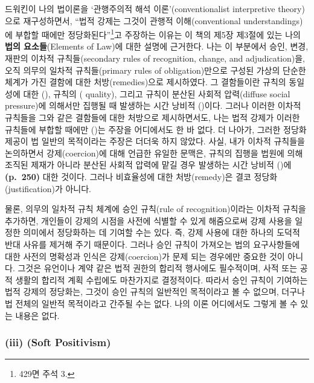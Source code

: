 드워킨이 나의 법이론을 `관행주의적 해석 이론'(conventionalist
interpretive theory)으로 재구성하면서, ``법적 강제는 그것이 관행적
이해(conventional understandings)에 부합할 때에만
정당화된다''\footnote{ 429면 주석 3.}고 주장하는 이유는 이 책의
제5장 제3절에 있는 나의 \textbf{법의 요소들}(Elements of Law)에 대한
설명에 근거한다. 나는 이 부분에서 승인, 변경, 재판의 이차적
규칙들(secondary rules of recognition, change, and adjudication)을, 오직
의무의 일차적 규칙들(primary rules of obligation)만으로 구성된 가상의
단순한 체계가 가진 결함에 대한 처방(remedies)으로 제시하였다. 그
결함들이란 규칙의 동일성에 대한 (),
규칙의 ( quality), 그리고 규칙이 분산된 사회적
압력(diffuse social pressure)에 의해서만 집행될 때 발생하는 시간 낭비적
()이다. 그러나 이러한 이차적 규칙들을
그와 같은 결함들에 대한 처방으로 제시하면서도, 나는 법적 강제가 이러한
규칙들에 부합할 때에만 ()는 주장을
어디에서도 한 바 없다. 더 나아가, 그러한 정당화 제공이 법 일반의
목적이라는 주장은 더더욱 하지 않았다. 사실, 내가 이차적 규칙들을
논의하면서 강제(coercion)에 대해 언급한 유일한 문맥은, 규칙의 집행을
법원에 의해 조직된 제재가 아니라 분산된 사회적 압력에 맡길 경우 발생하는
시간 낭비적 ()에 \textbf{(p.~250)}
대한 것이다. 그러나 비효율성에 대한 처방(remedy)은 결코
정당화(justification)가 아니다.

물론, 의무의 일차적 규칙 체계에 승인 규칙(rule of recognition)이라는
이차적 규칙을 추가하면, 개인들이 강제의 시점을 사전에 식별할 수 있게
해줌으로써 강제 사용을 일정한 의미에서 정당화하는 데 기여할 수는 있다.
즉, 강제 사용에 대한 하나의 도덕적 반대 사유를 제거해 주기 때문이다.
그러나 승인 규칙이 가져오는 법의 요구사항들에 대한 사전의 명확성과
인식은 강제(coercion)가 문제 되는 경우에만 중요한 것이 아니다. 그것은
유언이나 계약 같은 법적 권한의 합리적 행사에도 필수적이며, 사적 또는
공적 생활의 합리적 계획 수립에도 마찬가지로 결정적이다. 따라서 승인
규칙이 기여하는 법적 강제의 정당화는, 그것이 승인 규칙의 일반적인
목적이라고 볼 수 없으며, 더구나 법 전체의 일반적 목적이라고 간주될 수는
없다. 나의 이론 어디에서도 그렇게 볼 수 있는 내용은 없다.

\subsubsection{\texorpdfstring{(iii) (Soft
Positivism)}{(iii) 연성 실증주의(Soft Positivism)}}\label{iii-uxc5f0uxc131-uxc2e4uxc99duxc8fcuxc758soft-positivism}

